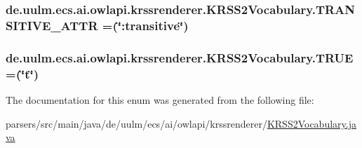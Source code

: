 \hypertarget{enumde_1_1uulm_1_1ecs_1_1ai_1_1owlapi_1_1krssrenderer_1_1_k_r_s_s2_vocabulary_a43c7f7d6144802a77695a54ba1607733}{
\subsubsection[{T\-R\-A\-N\-S\-I\-T\-I\-V\-E\-\_\-\-A\-T\-T\-R}]{\setlength{\rightskip}{0pt plus 5cm}de.\-uulm.\-ecs.\-ai.\-owlapi.\-krssrenderer.\-K\-R\-S\-S2\-Vocabulary.\-T\-R\-A\-N\-S\-I\-T\-I\-V\-E\-\_\-\-A\-T\-T\-R =(\char`\"{}\-:transitive\char`\"{})}}\label{enumde_1_1uulm_1_1ecs_1_1ai_1_1owlapi_1_1krssrenderer_1_1_k_r_s_s2_vocabulary_a43c7f7d6144802a77695a54ba1607733}
\hypertarget{enumde_1_1uulm_1_1ecs_1_1ai_1_1owlapi_1_1krssrenderer_1_1_k_r_s_s2_vocabulary_a6abb89318c39d6d95c6eb43e0b468e24}{
\subsubsection[{T\-R\-U\-E}]{\setlength{\rightskip}{0pt plus 5cm}de.\-uulm.\-ecs.\-ai.\-owlapi.\-krssrenderer.\-K\-R\-S\-S2\-Vocabulary.\-T\-R\-U\-E =(\char`\"{}t\char`\"{})}}\label{enumde_1_1uulm_1_1ecs_1_1ai_1_1owlapi_1_1krssrenderer_1_1_k_r_s_s2_vocabulary_a6abb89318c39d6d95c6eb43e0b468e24}


The documentation for this enum was generated from the following file\-:\begin{DoxyCompactItemize}
\item 
parsers/src/main/java/de/uulm/ecs/ai/owlapi/krssrenderer/\hyperlink{_k_r_s_s2_vocabulary_8java}{K\-R\-S\-S2\-Vocabulary.\-java}\end{DoxyCompactItemize}
